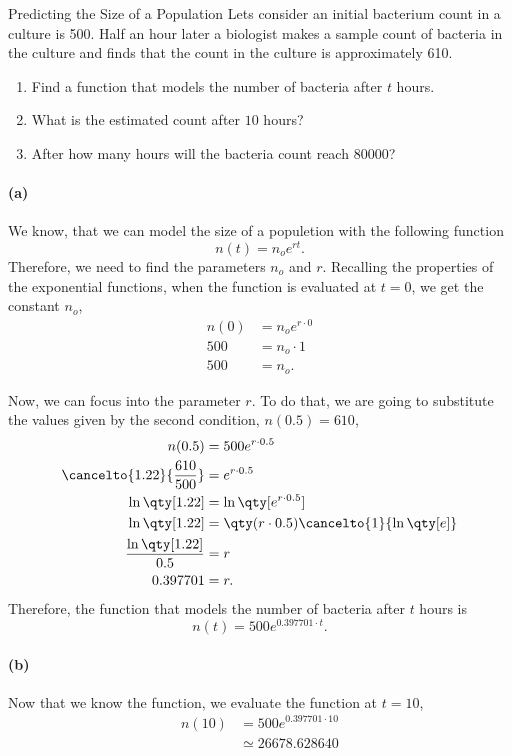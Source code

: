 \documentclass[../main.tex]{subfiles}
\begin{document}
\begin{example}{Predicting the Size of a Population}{}
    Lets consider an initial bacterium count in a culture is \num{500}.
    Half an hour later a biologist makes a sample count of bacteria in the culture and finds that the count in the culture is approximately \num{610}.
    \begin{enumerate}[label=(\alph*)]
        \item Find a function that models the number of bacteria after $t$ hours.
        \item What is the estimated count after $10$ hours?
        \item After how many hours will the bacteria count reach \num{80000}?
    \end{enumerate}

    \paragraph{(a)} We know, that we can model the size of a populetion with the following function \[n(t)=n_oe^{rt}.\]
    Therefore, we need to find the parameters $n_o$ and $r$.
    Recalling the properties of the exponential functions, when the function is evaluated at $t=0$, we get the constant $n_o$,
    \begin{align*}
        n(0) &= n_o e^{r\cdot0} \\
        500 &= n_o \cdot 1 \\
        500  &= n_o.
    \end{align*}

    Now, we can focus into the parameter $r$.
    To do that, we are going to substitute the values given by the second condition, $n(0.5) = \num{610}$,
    \begin{align*}
        n(0.5) &= 500 e^{r\cdot 0.5} \\
        \cancelto{1.22}{\frac{610}{500}} &= e^{r\cdot 0.5} \\
        \ln\qty[1.22] &= \ln\qty[e^{r\cdot 0.5}] \\
        \ln\qty[1.22] &= \qty(r\cdot 0.5)\cancelto{1}{\ln\qty[e]} \\
        \frac{\ln\qty[1.22]}{0.5} &= r \\
        0.397701 &= r.
    \end{align*}
    Therefore, the function that models the number of bacteria after $t$ hours is \[n(t)=500e^{0.397701\cdot t}.\]

    \paragraph{(b)} Now that we know the function, we evaluate the function at $t=10$,
    \begin{align*}
        n(10) &=500e^{0.397701\cdot 10} \\
              &\simeq \num{26678.628640}
    \end{align*}


\end{example}
\end{document}
